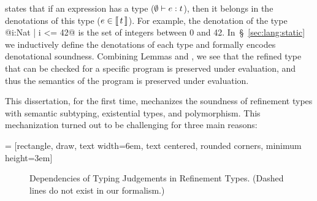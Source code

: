  states that if an expression has a type (${\emptyset} \vdash {e} : {t}$),
then it belongs in the denotations of this type ($e \in \llbracket\, t \,\rrbracket$).
For example, the denotation of the type @{i:Nat | i <= 42}@ is the set of integers
between 0 and 42.
%
In~\S~\ref{sec:lang:static} we inductively define the denotations of each type and
 formally encodes denotational soundness.
Combining Lemmas  and ,
we see that the refined \sysrf type that can be checked for a specific program
is preserved under evaluation, and thus the semantics of the program is 
preserved under evaluation.

This dissertation, for the first time, mechanizes the soundness of refinement types with
semantic subtyping, existential types, and polymorphism.
This mechanization turned out to be challenging for three main reasons:

 = [rectangle, draw,
    text width=6em, text centered, rounded corners, minimum height=3em]
\begin{figure}
\caption{Dependencies of Typing Judgements in Refinement Types. (Dashed lines do not exist in our formalism.) }
\label{fig:dependencies}
\end{figure}

